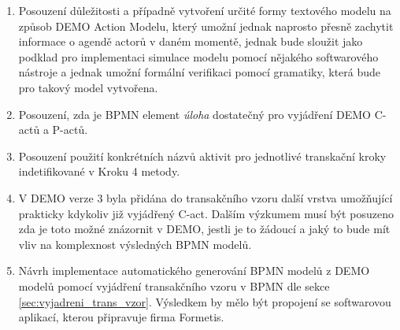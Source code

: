 \documentclass[]{article}
\begin{document}
\begin{enumerate}
\item Posouzení důležitosti a případně vytvoření určité formy textového modelu na způsob DEMO Action Modelu, který umožní jednak naprosto přesně zachytit informace o agendě actorů v daném momentě, jednak bude sloužit jako podklad pro implementaci simulace modelu pomocí nějakého softwarového nástroje a jednak umožní formální verifikaci pomocí gramatiky, která bude pro takový model vytvořena.
\item Posouzení, zda je BPMN element \textit{úloha} dostatečný pro vyjádření DEMO C-actů a P-actů.
\item Posouzení použití konkrétních názvů aktivit pro jednotlivé transkační kroky indetifikované v Kroku 4 metody.
\item V DEMO verze 3 byla přidána do transakčního vzoru další vrstva umožňující prakticky kdykoliv  již vyjádřený C-act. Dalším výzkumem musí být posuzeno zda je toto možné znázornit v DEMO, jestli je to žádoucí a jaký to bude mít vliv na komplexnost výsledných BPMN modelů.
\item Návrh implementace automatického generování BPMN modelů z DEMO modelů pomocí vyjádření transakčního vzoru v BPMN dle sekce \ref{sec:vyjadreni_trans_vzor}. Výsledkem by mělo být propojení se softwarovou aplikací, kterou připravuje firma Formetis.
\end{enumerate}

\nocite{*}


\end{document}
